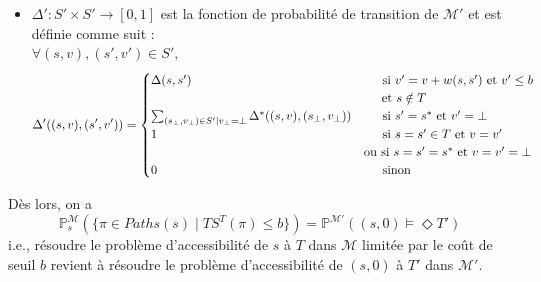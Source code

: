 \documentclass[12pt,a4paper]{report}
\theoremstyle{definition}%
\theoremstyle{remark}
\newcommand{\ie}{i.e., }
\newcommand{\pr}{\mathbb{P}}
\begin{document}
\begin{itemize}
\item $\Delta': S' \times S' \rightarrow [0,1]$ est la fonction de probabilité de transition de $\mathcal{M'}$ et est définie comme suit : \\
	$\forall (s, v), (s', v') \in S',$
\[
\Delta'((s, v), (s', v')) =  
\begin{cases}
\Delta(s, s') & \text{\quad \, si $v' = v + w(s, s')$ et $v' \leq b$}  \\
	& %
	\quad \;\, \text{et $s \notin T$} \\
\sum_{(s_\bot, v_\bot) \in S' | v_\bot = \bot} \Delta^*((s, v), (s_\bot, v_\bot)) & \quad \, \text{ si $s' = s^*$ et $v' = \bot$} \\
1 & \quad \, \text{ si $s = s' \in T$ et $v = v'$} \\
& \text{ou si $s = s' = s^*$ et $v = v' = \bot$} \\
0 & \quad \, \text{ sinon}
\end{cases}
\]
\end{itemize}
 Dès lors, on a \[\pr^\mathcal{M}_s(\{\pi \in Paths(s) \; | \; TS^T(\pi) \leq b \}) = \pr^\mathcal{M'}((s, 0) \models \Diamond T')\]
\ie résoudre le problème d'accessibilité de $s$ à $T$ dans $\mathcal{M}$ limitée par le coût de seuil $b$ revient à résoudre le problème d'accessibilité de $(s, 0)$ à $T'$ dans $\mathcal{M'}$.
\end{document}
